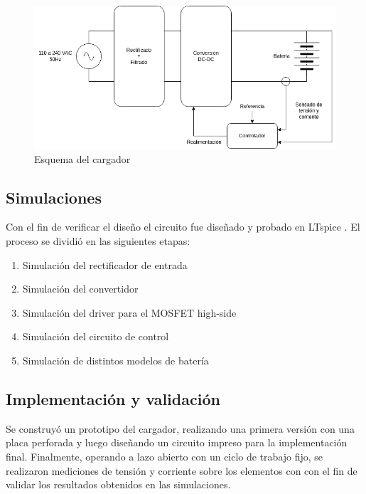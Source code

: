 \begin{figure}
    \centering
    \includegraphics[width=\textwidth]{images/esquema_cargador_v2.png}
    \caption{Esquema del cargador}
    \label{fig:esquema_cargador}
\end{figure}

\subsection{Simulaciones}
Con el fin de verificar el diseño el circuito fue diseñado y probado en LTspice \cite{ltspice}.
El proceso se dividió en las siguientes etapas:
\begin{enumerate}
    \item Simulación del rectificador de entrada
    \item Simulación del convertidor
    \item Simulación del driver para el MOSFET high-side
    \item Simulación del circuito de control
    \item Simulación de distintos modelos de batería
\end{enumerate}

\subsection{Implementación y validación}
Se construyó un prototipo del cargador, realizando una primera versión con una placa perforada
y luego diseñando un circuito impreso para la implementación final.
Finalmente, operando a lazo abierto con un ciclo de trabajo fijo, se realizaron mediciones de tensión y corriente sobre los elementos con
con el fin de validar los resultados obtenidos en las simulaciones.